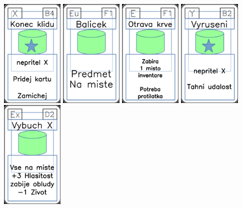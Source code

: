 \documentclass[a4paper]{article}
\begin{document}
	\includegraphics[width=3.0cm]{img-5_8}
	\includegraphics[width=3.0cm]{img-4_25}
	\includegraphics[width=3.0cm]{img-4_55}
	\includegraphics[width=3.0cm]{img-5_36}
	\includegraphics[width=3.0cm]{img-4_16}
\end{document}

